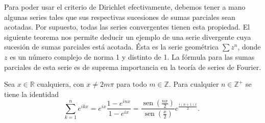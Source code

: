 Para poder usar el criterio de Dirichlet efectivamente, debemos tener a mano algunas series tales que sus respectivas sucesiones de sumas parciales sean acotadas. Por supuesto, todas las series convergentes tienen esta propiedad. El siguiente teorema nos permite deducir un ejemplo de una serie divergente cuya sucesión de sumas parciales está acotada. Ésta es la serie geométrica $\sum z^n$, donde $z$ es un número complejo de norma 1 y distinto de 1. La fórmula para las sumas parciales de esta serie es de suprema importancia en la teoría de series de Fourier.  
\begin{theorem}\label{tma_ec_10}
  Sea $x \in \mathbb{R}$ cualquiera, con $x \neq 2 m \pi$ para todo $m \in \mathbb{Z}$. Para cualquier $n \in \mathbb{Z}^{+}$ se tiene la identidad
  \begin{equation}\label{eqn:identidad_10}
    \sum_{k=1}^{n} e^{i k x}=e^{i x} \frac{1-e^{i n x}}{1-e^{i x}}=\frac{\operatorname{sen}\left(\frac{n x}{2}\right)}{\operatorname{sen}\left(\frac{x}{2}\right)} e^{\frac{i(n+1) x}{2}} \text {. }
  \end{equation}
\end{theorem}
